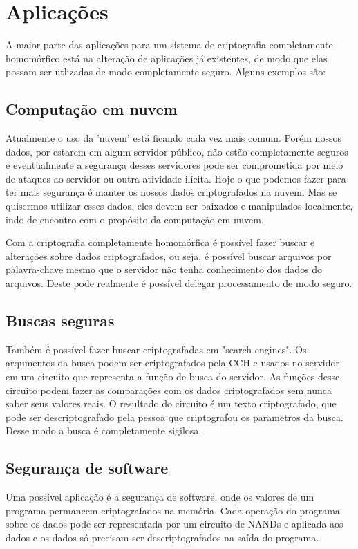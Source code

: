 \section{Aplicações}\label{sec:LABEL_CHP_1_SEC_E}
A maior parte das aplicações para um sistema de criptografia completamente homomórfico está na alteração de aplicações já existentes, de modo que elas possam ser utlizadas de modo completamente seguro. Alguns exemplos são:

	\subsection{Computação em nuvem}
	Atualmente o uso da 'nuvem' está ficando cada vez mais comum. Porém nossos dados, por estarem em algum servidor público, não estão completamente seguros e eventualmente a segurança desses servidores pode ser comprometida por meio de ataques ao servidor ou outra atividade ilícita.
	Hoje o que podemos fazer para ter mais segurança é manter os nossos dados criptografados na nuvem. Mas se quisermos utilizar esses dados, eles devem ser baixados e manipulados localmente, indo de encontro com o propósito da computação em nuvem.
	
	Com a criptografia completamente homomórfica é possível fazer buscar e alterações sobre dados criptografados, ou seja, é possível buscar arquivos por palavra-chave mesmo que o servidor não tenha conhecimento dos dados do arquivos. Deste pode realmente é possível delegar processamento de modo seguro.
	
	\subsection{Buscas seguras}
	Também é possível fazer buscar criptografadas em "search-engines". Os arqumentos da busca podem ser criptografados pela CCH e usados no servidor em um circuito que representa a função de busca do servidor. As funções desse circuito podem fazer as comparações com os dados criptografados sem nunca saber seus valores reais.
	O resultado do circuito é um texto criptografado, que pode ser descriptografado pela pessoa que criptografou os parametros da busca. Desse modo a busca é completamente sigilosa.
	
	\subsection{Segurança de software}
	Uma possível aplicação é a segurança de software, onde os valores de um programa permancem criptografados na memória. Cada operação do programa sobre os dados pode ser representada por um circuito de NANDs e aplicada aos dados e os dados só precisam ser descriptografados na saída do programa.
	
